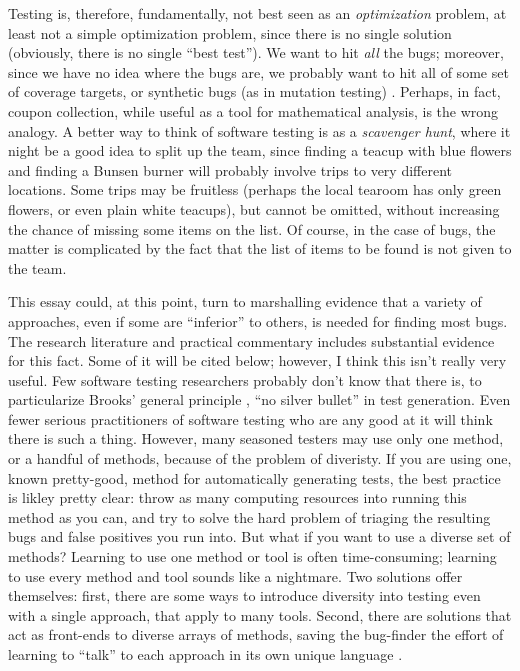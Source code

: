 \documentclass[sigplan,review]{acmart}
\begin{document}
Testing is, therefore,
fundamentally, not best seen as an \emph{optimization} problem, at
least not a simple optimization problem, since
there is no single solution (obviously, there is no single ``best
test'').  We want to hit \emph{all} the bugs; moreover, since we have
no idea where the bugs are, we probably want to hit all of some set of
coverage targets, or synthetic bugs (as in mutation testing)
\cite{Discontents}.  Perhaps, in fact, coupon collection, while useful
as a tool for mathematical analysis, is the wrong analogy.  A better
way to think of software testing is as a \emph{scavenger hunt}, where
it night be a good idea to split up the team, since finding a teacup
with blue flowers and finding a Bunsen burner will probably involve
trips to very different locations.  Some trips may be fruitless
(perhaps the local tearoom has only green flowers, or even plain white
teacups), but cannot be omitted, without increasing the chance of
missing some items on the list.  Of course, in the case of bugs, the
matter is complicated by the fact that the list of items to be found
is not given to the team.

This essay could, at this point, turn to marshalling evidence that a
variety of approaches, even if some are ``inferior'' to others, is
needed for finding most bugs.  The research literature and practical
commentary includes substantial evidence for this fact.  Some of it
will be cited below; however, I think this isn't really very useful.
Few software testing researchers probably don't know that there is, to
particularize Brooks' general principle \cite{Brooks1987NoSB}, ``no silver bullet'' in test
generation.  Even fewer serious practitioners of software testing who
are any good at it will think there is such a thing.  However, many
seasoned testers may use only one method, or a handful of methods,
because of the problem of diveristy.  If you are using one, known
pretty-good, method for automatically generating tests, the best
practice is likley pretty clear:  throw as many computing resources
into running this method as you can, and try to solve the hard problem
of triaging the resulting bugs and false positives you run into.  But
what if you want to use a diverse set of methods?  Learning to use one
method or tool is often time-consuming; learning to use every method
and tool sounds like a nightmare.  Two solutions offer themselves:
first, there are some ways to introduce diversity into testing even
with a single approach, that apply to many tools.  Second, there are
solutions that act as front-ends to diverse arrays of methods, saving
the bug-finder the effort of learning to ``talk'' to each approach in
its own unique language \cite{WODACommon}.
\end{document}
